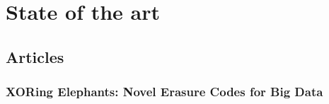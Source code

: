 \chapter{State of the art}

\section{Articles}

\subsection{XORing Elephants: Novel Erasure Codes for Big Data}

\autocite{XorbasVLDB}